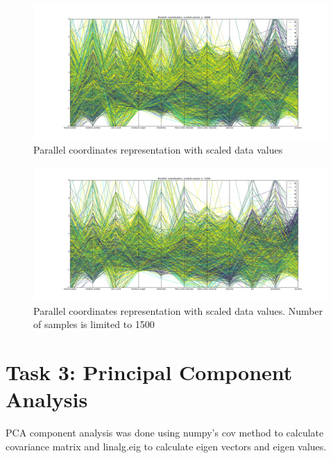 \documentclass[12pt]{article}
\begin{document}
\begin{figure}[H]
    \centering
    \includegraphics[width=1\textwidth]{parallel_scaled}
    \caption{Parallel coordinates representation with scaled data values}
    \label{fig:parallel_scaled}
\end{figure}

\begin{figure}[H]
    \centering
    \includegraphics[width=1\textwidth]{parallel_scaled_subsample}
    \caption{Parallel coordinates representation with scaled data values. Number of samples is limited to 1500}
    \label{fig:parallel_scaled_subsample}
\end{figure}

\section{Task 3: Principal Component Analysis}

PCA component analysis was done using numpy's cov method to calculate covariance matrix and linalg.eig to calculate eigen vectors and eigen values.
\end{document}
